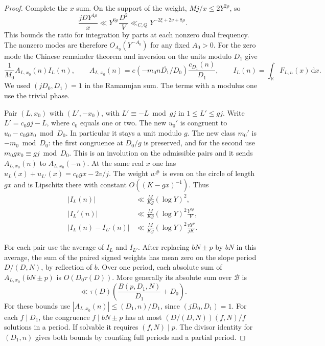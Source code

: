 \documentclass[11pt,a4paper]{article}
\numberwithin{equation}{section}
\newcommand{\ud}{\mathrm d}
\begin{document}
\begin{proof}
Complete the $x$ sum. On the support of the weight,
$Mj/x\le 2Y^{2\rho}$, so
\[
 \frac{jD Y^{4\rho}}{x}
       \ll Y^{6\rho}\frac{D^2}{V}
       \ll_{C,Q}Y^{-2\xi+2\nu+8\rho}.
\]
This bounds the ratio for integration by parts at each
nonzero dual frequency. The nonzero modes are therefore
$O_{A_0}(Y^{-A_0})$ for any fixed $A_0>0$.
For the zero mode the Chinese remainder theorem
and inversion on the units modulo $D_1$ give
\begin{equation}
 \frac{1}{M_0} A_{L,x_0}(n) I_L(n),\qquad
 A_{L,x_0}(n)=e(-m_0 n\overline{D_1}/D_0)\frac{c_{D_1}(n)}{D_1},
 \qquad I_L(n)=\int_{\mathbb R}F_{L,n}(x)\,\ud x .
 \label{eq:criticalgridclippedramanujan}
\end{equation}
We used $(jD_0,D_1)=1$ in the Ramanujan sum.
The terms with a modulus one use the trivial phase.

Pair $(L,x_0)$ with $(L',-x_0)$, with
$L'\equiv-L\bmod gj$ in $1\le L'\le gj$.
Write $L'=c_0gj-L$, where $c_0$ equals one or two.
The new $u_0'$ is congruent to $u_0-c_0g x_0\bmod D_0$.
In particular it stays a unit modulo $g$.
The new class $m_0'$ is $-m_0\bmod D_0$: the first
congruence at $D_0/g$ is preserved, and for the second
use $m_0 g x_0\equiv gj\bmod D_0$.
This is an involution on the admissible pairs and
it sends $A_{L,x_0}(n)$ to $A_{L,x_0}(-n)$.
At the same real $x$ one has
$u_L(x)+u_{L'}(x)=c_0gx-2v/j$.
The weight $w^\#$ is even on the circle of length $gx$
and is Lipschitz there with constant $O((K-gx)^{-1})$.
Thus
\begin{align*}
 |I_L(n)| &\ll \frac{M}{Kg}(\log Y)^2,\\
 |I_L'(n)| &\ll \frac{M}{Kg}(\log Y)^2\frac{Y^{2\rho}}V,\\
 |I_L(n)-I_{L'}(n)|
     &\ll \frac{M}{Kg}(\log Y)^2\frac{vY^\rho}{jK}.
\end{align*}

For each pair use the average of $I_L$ and $I_{L'}$.
After replacing $bN\pm p$ by $bN$ in this average,
the sum of the paired signed weights has mean zero on
the slope period $D/(D,N)$, by reflection of $b$.
Over one period, each absolute sum of
$A_{L,x_0}(bN\pm p)$ is $O(D_0\tau(D))$.
More generally its absolute sum over $\mathcal B$ is
\begin{equation}
 \ll \tau(D)
       \left(\frac{B(p,D_1,N)}{D_1}+D_0\right).
 \label{eq:criticalgridclippedperiod}
\end{equation}
For these bounds use $|A_{L,x_0}(n)|\le (D_1,n)/D_1$,
since $(jD_0,D_1)=1$.
For each $f\mid D_1$, the congruence $f\mid bN\pm p$
has at most $(D/(D,N))(f,N)/f$ solutions in a period.
If solvable it requires $(f,N)\mid p$.
The divisor identity for $(D_1,n)$ gives both
bounds by counting full periods and a partial period.


\end{proof}
\end{document}
